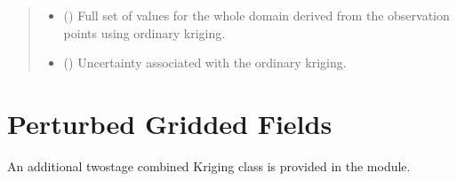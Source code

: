 \documentclass[letterpaper,10pt,english]{sphinxmanual}
\begin{document}
\begin{fulllineitems}
\begin{quote}
\begin{description}
\begin{itemize}
\end{itemize}

\sphinxAtStartPar
{}

\sphinxAtStartPar
\begin{itemize}
\item {}
\sphinxAtStartPar
{} () \textendash{} Full set of values for the whole domain derived from the observation
points using ordinary kriging.

\item {}
\sphinxAtStartPar
{} () \textendash{} Uncertainty associated with the ordinary kriging.

\end{itemize}


\end{description}\end{quote}

\end{fulllineitems}



\section{Perturbed Gridded Fields}
\label{\detokenize{kriging:perturbed-gridded-fields}}
\sphinxAtStartPar
An additional two\sphinxhyphen{}stage combined Kriging class is provided in the  module.
\end{document}
